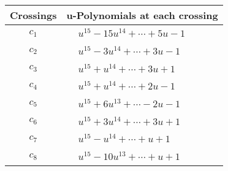 \documentclass[1p]{elsarticle_modified}
\theoremstyle{definition}
\begin{document}
\begin{tabular}{m{50pt}|m{274pt}}
Crossings & \hspace{64pt}u-Polynomials at each crossing \\
\hline $$\begin{aligned}c_{1}\end{aligned}$$&$\begin{aligned}
&u^{15}-15 u^{14}+\cdots+5 u-1
\end{aligned}$\\
\hline $$\begin{aligned}c_{2}\end{aligned}$$&$\begin{aligned}
&u^{15}-3 u^{14}+\cdots+3 u-1
\end{aligned}$\\
\hline $$\begin{aligned}c_{3}\end{aligned}$$&$\begin{aligned}
&u^{15}+u^{14}+\cdots+3 u+1
\end{aligned}$\\
\hline $$\begin{aligned}c_{4}\end{aligned}$$&$\begin{aligned}
&u^{15}+u^{14}+\cdots+2 u-1
\end{aligned}$\\
\hline $$\begin{aligned}c_{5}\end{aligned}$$&$\begin{aligned}
&u^{15}+6 u^{13}+\cdots-2 u-1
\end{aligned}$\\
\hline $$\begin{aligned}c_{6}\end{aligned}$$&$\begin{aligned}
&u^{15}+3 u^{14}+\cdots+3 u+1
\end{aligned}$\\
\hline $$\begin{aligned}c_{7}\end{aligned}$$&$\begin{aligned}
&u^{15}- u^{14}+\cdots+u+1
\end{aligned}$\\
\hline $$\begin{aligned}c_{8}\end{aligned}$$&$\begin{aligned}
&u^{15}-10 u^{13}+\cdots+u+1
\end{aligned}$\\

\end{tabular}
\end{document}
